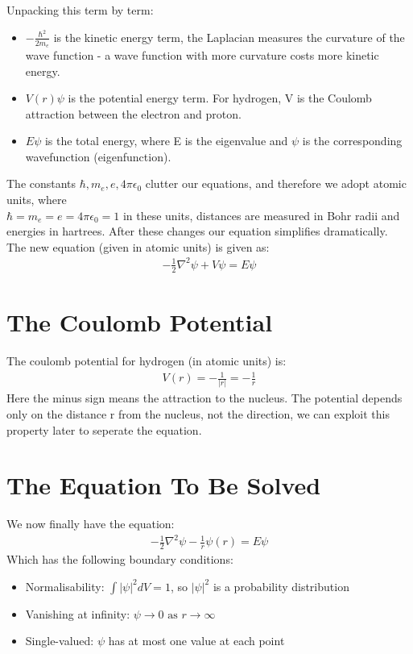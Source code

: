 \documentclass{article}
\begin{document}
Unpacking this term by term:
\begin{itemize}
\item $- \frac{\hbar^2}{2m_e}$ is the kinetic energy term, the Laplacian measures the curvature of the wave function - a wave function with more curvature costs more kinetic energy.
\item $V(r)\psi$ is the potential energy term. For hydrogen, V is the Coulomb attraction between the electron and proton.
\item $E\psi$ is the total energy, where E is the eigenvalue and $\psi$ is the corresponding wavefunction (eigenfunction).
\end{itemize}
The constants $\hbar,m_e,e,4\pi\epsilon_0$ clutter our equations, and therefore we adopt atomic units, where\\ $\hbar = m_e = e = 4\pi\epsilon_0 = 1$ in these units, distances are measured in Bohr radii and energies in hartrees. After these changes our equation simplifies dramatically.\\
The new equation (given in atomic units) is given as:
\begin{align*}
    -\frac{1}{2} \nabla^2\psi + V\psi = E\psi
 \end{align*}
\newpage
 \section{The Coulomb Potential}
 The coulomb potential for hydrogen (in atomic units) is:
 \begin{align*}
     V(r) = -\frac{1}{|r|} = -\frac{1}{r}
 \end{align*}
 Here the minus sign means the attraction to the nucleus. The potential depends only on the distance r from the nucleus, not the direction, we can exploit this property later to seperate the equation.

 \section{The Equation To Be Solved}
 We now finally have the equation:
 \begin{align*}
     -\frac{1}{2} \nabla^2\psi - \frac{1}{r}\psi(r) = E\psi
 \end{align*}
 Which has the following boundary conditions:
 \begin{itemize}
     \item Normalisability: $\int |\psi|^2dV = 1$, so $|\psi|^2$ is a probability distribution
     \item Vanishing at infinity: $\psi \rightarrow 0 \text{ as }r \rightarrow \infty$
     \item Single-valued: $\psi$ has at most one value at each point
 \end{itemize}
\end{document}
